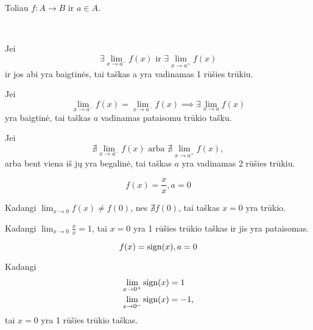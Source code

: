 \begin{note}
  Toliau $f: A \to B$ ir $a \in A$.
\end{note}

\begin{defn}
  \begin{description}
    \hfill \\
    \item[1 rūšies trūkis] Jei 
      \begin{equation*}
        \exists \lim _{x \to a^{-}} f(x) 
        \text{ ir }
        \exists \lim _{x \to a^{+}} f(x) 
      \end{equation*}
       ir jos abi yra baigtinės, tai
      taškas a yra vadinamas 1 rūšies trūkiu.
    \item[pataisomas trūkis] Jei
      \begin{equation*}
        \lim _{x \to a^{-}} f(x) = \lim _{x \to a^{-}} f(x) 
        \implies \exists \lim _{x \to a} f(x)
      \end{equation*}
      yra baigtinė, tai taškas $a$ vadinamas pataisomu trūkio tašku.
    \item[2 rūšies trūkis] Jei
      \begin{equation*}
        \nexists \lim _{x \to a^{-}} f(x)
        \text{ arba }
        \nexists \lim _{x \to a^{+}} f(x),
      \end{equation*}
      arba bent viena iš jų yra begalinė, tai taškas $a$ yra vadinamas
      2 rūšies trūkiu.
  \end{description}
\end{defn}

\begin{exmp}
  \begin{equation*}
    f(x) = \frac{x}{x}, a = 0
  \end{equation*}

  Kadangi $\lim _{x \to 0} f(x) \neq f(0)$, nes $\nexists f(0)$, tai
  taškas $x = 0$ yra trūkio.

  Kadangi $\lim _{x \to 0} \frac{x}{x} = 1$, tai $x = 0$ yra 1 rūšies
  trūkio taškas ir jis yra pataisomas.
\end{exmp}

\begin{exmp}
  \begin{equation*}
    f(x) = \mathop{\text{sign}}(x), a = 0
  \end{equation*}

  Kadangi
  \begin{align*}
    \lim _{x \to 0^{+}} \mathop{\text{sign}}(x) &= 1 \\
    \lim _{x \to 0^{-}} \mathop{\text{sign}}(x) &= -1,
  \end{align*}
  tai $x = 0$ yra 1 rūšies trūkio taškas.
\end{exmp}

